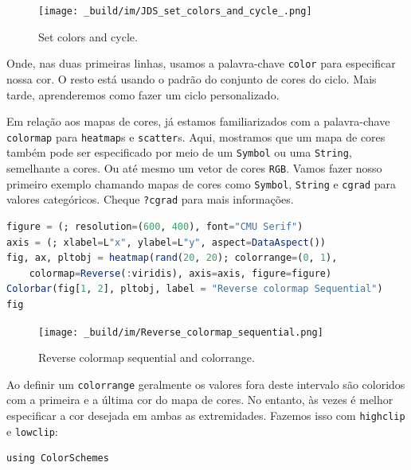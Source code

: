\documentclass[
  notoc %
]{tufte-book}
\newcommand{\passthrough}[1]{#1}
\begin{document}
\begin{figure}
\hypertarget{fig:set_colors_and_cycle}{%
\centering
\texttt{[image: \_build/im/JDS\_set\_colors\_and\_cycle\_.png]}
\caption{Set colors and cycle.}\label{fig:set_colors_and_cycle}
}
\end{figure}

Onde, nas duas primeiras linhas, usamos a palavra-chave
\passthrough{\lstinline!color!} para especificar nossa cor. O resto está
usando o padrão do conjunto de cores do ciclo. Mais tarde, aprenderemos
como fazer um ciclo personalizado.

Em relação aos mapas de cores, já estamos familiarizados com a
palavra-chave \passthrough{\lstinline!colormap!} para
\passthrough{\lstinline!heatmap!}s e \passthrough{\lstinline!scatter!}s.
Aqui, mostramos que um mapa de cores também pode ser especificado por
meio de um \passthrough{\lstinline!Symbol!} ou uma
\passthrough{\lstinline!String!}, semelhante a cores. Ou até mesmo um
vetor de cores \passthrough{\lstinline!RGB!}. Vamos fazer nosso primeiro
exemplo chamando mapas de cores como \passthrough{\lstinline!Symbol!},
\passthrough{\lstinline!String!} e \passthrough{\lstinline!cgrad!} para
valores categóricos. Cheque \passthrough{\lstinline!?cgrad!} para mais
informações.

\begin{lstlisting}[language=Julia]
figure = (; resolution=(600, 400), font="CMU Serif")
axis = (; xlabel=L"x", ylabel=L"y", aspect=DataAspect())
fig, ax, pltobj = heatmap(rand(20, 20); colorrange=(0, 1),
    colormap=Reverse(:viridis), axis=axis, figure=figure)
Colorbar(fig[1, 2], pltobj, label = "Reverse colormap Sequential")
fig
\end{lstlisting}

\begin{figure}
\hypertarget{fig:Reverse_colormap_sequential}{%
\centering
\texttt{[image: \_build/im/Reverse\_colormap\_sequential.png]}
\caption{Reverse colormap sequential and
colorrange.}\label{fig:Reverse_colormap_sequential}
}
\end{figure}

Ao definir um \passthrough{\lstinline!colorrange!} geralmente os valores
fora deste intervalo são coloridos com a primeira e a última cor do mapa
de cores. No entanto, às vezes é melhor especificar a cor desejada em
ambas as extremidades. Fazemos isso com
\passthrough{\lstinline!highclip!} e \passthrough{\lstinline!lowclip!}:

\begin{lstlisting}
using ColorSchemes
\end{lstlisting}
\end{document}
